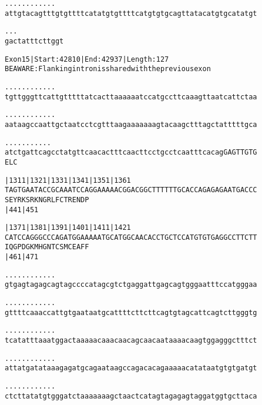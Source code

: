 \documentclass{article}
\begin{document}
\newpage
\begin{alltt}
 .    .    .    .    .    .    .    .    .    .    .    .
attgtacagtttgtgttttcatatgtgttttcatgtgtgcagttatacatgtgcatatgt



 .    .    .
gactatttcttggt


\end{alltt}
\newpage
\begin{alltt}
Exon 15 | Start: 42810 | End: 42937 | Length: 127
BE AWARE: Flanking intron is shared with the previous exon

.    .    .    .    .    .    .    .    .    .    .    .
tgttgggttcattgtttttatcacttaaaaaatccatgccttcaaagttaatcattctaa



.    .    .    .    .    .    .    .    .    .    .    .
aataagccaattgctaatcctcgtttaagaaaaaaagtacaagctttagctatttttgca



.    .    .    .    .    .    .    .    .    .    .
atctgattcagcctatgttcaacactttcaacttcctgcctcaatttcacagGAGTTGTG
                                                    E  L  C


|1311     |1321     |1331     |1341     |1351     |1361
TAGTGAATACCGCAAATCCAGGAAAAACGGACGGCTTTTTTGCACCAGAGAGAATGACCC
 S  E  Y  R  K  S  R  K  N  G  R  L  F  C  T  R  E  N  D  P
          |441                          |451

|1371     |1381     |1391     |1401     |1411     |1421
CATCCAGGGCCCAGATGGAAAAATGCATGGCAACACCTGCTCCATGTGTGAGGCCTTCTT
 I  Q  G  P  D  G  K  M  H  G  N  T  C  S  M  C  E  A  F  F
          |461                          |471

    .    .    .    .    .    .    .    .    .    .    .    .
gtgagtagagcagtagccccatagcgtctgaggattgagcagtgggaatttccatgggaa



    .    .    .    .    .    .    .    .    .    .    .    .
gttttcaaaccattgtgaataatgcattttcttcttcagtgtagcattcagtcttgggtg



    .    .    .    .    .    .    .    .    .    .    .    .
tcatatttaaatggactaaaaacaaacaacagcaacaataaaacaagtggagggctttct



\end{alltt}
\newpage
\begin{alltt}
    .    .    .    .    .    .    .    .    .    .    .    .
attatgatataaagagatgcagaataagccagacacagaaaaacatataatgtgtgatgt



    .    .    .    .    .    .    .    .    .    .    .    .
ctcttatatgtgggatctaaaaaaagctaactcatagtagagagtaggatggtgcttaca


\end{alltt}
\end{document}

